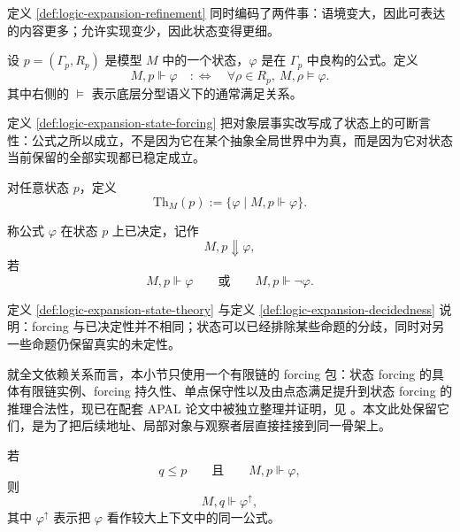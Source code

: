 定义 \ref{def:logic-expansion-refinement} 同时编码了两件事：语境变大，因此可表达的内容更多；允许实现变少，因此状态变得更细。

\begin{definition}[状态 forcing]\label{def:logic-expansion-state-forcing}
设 \(p=(\Gamma_p,R_p)\) 是模型 \(M\) 中的一个状态，\(\varphi\) 是在 \(\Gamma_p\) 中良构的公式。定义
\[
M,p\Vdash \varphi
\quad:\Longleftrightarrow\quad
\forall \rho\in R_p,\ M,\rho\models \varphi.
\]
其中右侧的 \(\models\) 表示底层分型语义下的通常满足关系。
\end{definition}

定义 \ref{def:logic-expansion-state-forcing} 把对象层事实改写成了状态上的可断言性：公式之所以成立，不是因为它在某个抽象全局世界中为真，而是因为它对状态当前保留的全部实现都已稳定成立。

\begin{definition}[状态理论]\label{def:logic-expansion-state-theory}
对任意状态 \(p\)，定义
\[
\mathrm{Th}_M(p)
:=
\{\varphi \mid M,p\Vdash \varphi\}.
\]
\end{definition}

\begin{definition}[已决定性]\label{def:logic-expansion-decidedness}
称公式 \(\varphi\) 在状态 \(p\) 上已决定，记作
\[
M,p\Downarrow \varphi,
\]
若
\[
M,p\Vdash \varphi
\qquad\text{或}\qquad
M,p\Vdash \neg\varphi.
\]
\end{definition}

定义 \ref{def:logic-expansion-state-theory} 与定义 \ref{def:logic-expansion-decidedness} 说明：forcing 与已决定性并不相同；状态可以已经排除某些命题的分歧，同时对另一些命题仍保留真实的未定性。

就全文依赖关系而言，本小节只使用一个有限链的 forcing 包：状态 forcing 的具体有限链实例、forcing 持久性、单点保守性以及由点态满足提升到状态 forcing 的推理合法性，现已在配套 APAL 论文中被独立整理并证明，见 \cite{MaZhang2026StateForcingSemantics}。本文此处保留它们，是为了把后续地址、局部对象与观察者层直接挂接到同一骨架上。

\begin{proposition}\label{prop:logic-expansion-forcing-persistence}
若
\[
q\le p
\qquad\text{且}\qquad
M,p\Vdash \varphi,
\]
则
\[
M,q\Vdash \varphi^\uparrow,
\]
其中 \(\varphi^\uparrow\) 表示把 \(\varphi\) 看作较大上下文中的同一公式。
\end{proposition}

